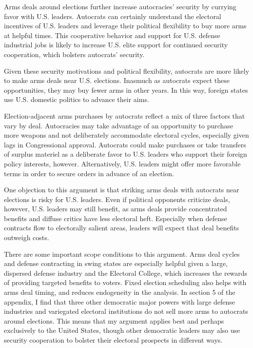 \documentclass[12pt]{article}
\begin{document}
Arms deals around elections further increase autocracies' security by currying favor with U.S. leaders.
Autocrats can certainly understand the electoral incentives of U.S. leaders and leverage their political flexibility to buy more arms at helpful times. 
This cooperative behavior and support for U.S. defense industrial jobs is likely to increase U.S. elite support for continued security cooperation, which bolsters autocrats' security.


Given these security motivations and political flexibility, autocrats are more likely to make arms deals near U.S. elections.
Inasmuch as autocrats expect these opportunities, they may buy fewer arms in other years.
In this way, foreign states use U.S. domestic politics to advance their aims. 


Election-adjacent arms purchases by autocrats reflect a mix of three factors that vary by deal.
Autocracies may take advantage of an opportunity to purchase more weapons and not deliberately accommodate electoral cycles, especially given lags in Congressional approval.
Autocrats could make purchases or take transfers of surplus materiel as a deliberate favor to U.S. leaders who support their foreign policy interests, however. 
Alternatively, U.S. leaders might offer more favorable terms in order to secure orders in advance of an election.


One objection to this argument is that striking arms deals with autocrats near elections is risky for U.S. leaders. 
Even if political opponents criticize deals, however, U.S. leaders may still benefit, as arms deals provide concentrated benefits and diffuse critics have less electoral heft.
Especially when defense contracts flow to electorally salient areas, leaders will expect that deal benefits outweigh costs. 


There are some important scope conditions to this argument. 
Arms deal cycles and defense contracting in swing states are especially helpful given a large, dispersed defense industry and the Electoral College, which increases the rewards of providing targeted benefits to voters. 
Fixed election scheduling also helps with arms deal timing, and reduces endogeneity in the analysis.  
In section 5 of the appendix, I find that three other democratic major powers with large defense industries and variegated electoral institutions do not sell more arms to autocrats around elections. 
This means that my argument applies best and perhaps exclusively to the United States, though other democratic leaders may also use security cooperation to bolster their electoral prospects in different ways. 
\end{document}
